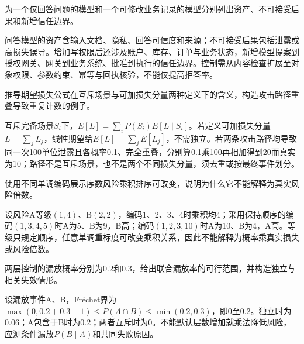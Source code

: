
\begin{exercises}
\begin{exercise} 为一个仅回答问题的模型和一个可修改业务记录的模型分别列出资产、不可接受后果和新增信任边界。

\begin{solution}
问答模型的资产含输入文档、隐私、回答可信度和来源；不可接受后果包括泄露或高损失误导。增加写权限后还涉及账户、库存、订单与业务状态，新增模型提案到授权网关、网关到业务系统、批准到执行的信任边界。控制需从内容检查扩展至对象权限、参数约束、幂等与回执核验，不能仅提高拒答率。
\end{solution}
\end{exercise}

\begin{exercise} 推导期望损失公式在互斥场景与可加损失分量两种定义下的含义，构造攻击路径重叠导致重复计数的例子。

\begin{solution}
互斥完备场景$S_i$下，$E[L]=\sum_iP(S_i)E[L\mid S_i]$。若定义可加损失分量$L=\sum_jL_j$，线性期望给$E[L]=\sum_jE[L_j]$，不需独立。若两条攻击路径均导致同一次100单位泄露且各概率0.1、完全重叠，分别算0.1乘100再相加得到20而真实为10；路径不是互斥场景，也不是两个不同损失分量，须去重或按最终事件划分。
\end{solution}
\end{exercise}

\begin{exercise}\optional 使用不同单调编码展示序数风险乘积排序可改变，说明为什么它不能解释为真实风险倍数。

\begin{solution}
设风险A等级$(1,4)$、B$(2,2)$，编码1、2、3、4时乘积均4；采用保持顺序的编码$(1,3,4,5)$时A为5、B为9，B高；编码$(1,2,3,10)$时A为10、B为4，A高。等级只规定顺序，任意单调重标度可改变乘积关系，因此不能解释为概率乘真实损失或风险倍数。
\end{solution}
\end{exercise}

\begin{exercise} 两层控制的漏放概率分别为0.2和0.3，给出联合漏放率的可行范围，并构造独立与相关失效情形。

\begin{solution}
设漏放事件A、B，Fréchet界为$\max(0,0.2+0.3-1)\le P(A\cap B)\le\min(0.2,0.3)$，即0至0.2。独立时为0.06；A包含于B时为0.2；两者互斥时为0。不能默认层数增加就乘法降低风险，应测条件漏放$P(B\mid A)$和共同失败原因。
\end{solution}
\end{exercise}


\end{exercises}
